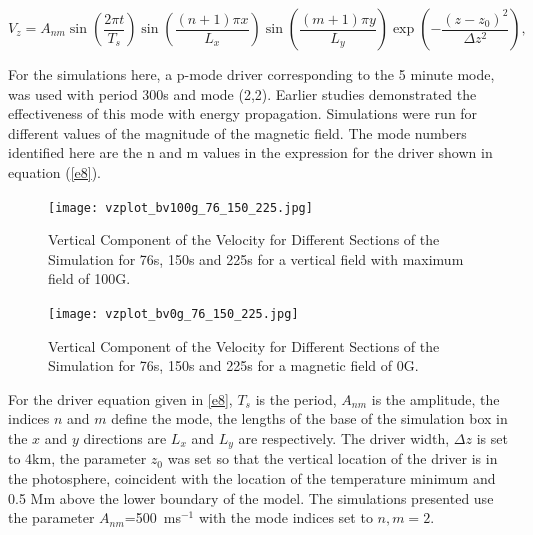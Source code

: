 \documentclass[linenumbers]{aastex63}
\begin{document}
\begin{equation}
 V_{z}  =  A_{nm} \sin\left(\frac{2\pi t}{T_s} \right)\sin\left(  \frac{(n+1)\pi x}{L_x} \right)  
 \sin\left(\frac{(m+1)\pi y}{L_y} \right) \exp\left( -\frac{(z-z_0)^2}{\Delta z^2} \right),
\label{e8}
\end{equation}

For the  simulations here, a p-mode driver corresponding to the 5 minute mode, was used with period 300s and mode (2,2). Earlier studies demonstrated the effectiveness of this mode with energy propagation. Simulations were run for different values of the magnitude of the magnetic field. The mode numbers identified here are the n and m values in the expression for the driver shown in equation (\ref{e8}).


\begin{figure}\label{vzplot_bv100g_76_150_225}
\texttt{[image: vzplot\_bv100g\_76\_150\_225.jpg]}
\caption{Vertical Component of the Velocity for Different Sections of the Simulation for 76s, 150s and 225s for a vertical field with maximum field of 100G.}
\end{figure}



\begin{figure}\label{vzplot_bv0g_76_150_225}
\texttt{[image: vzplot\_bv0g\_76\_150\_225.jpg]}
\caption{Vertical Component of the Velocity for Different Sections of the Simulation for 76s, 150s and 225s for a magnetic field of 0G.}
\end{figure}





For the driver equation given in \ref{e8}, $T_{s}$ is the period, $A_{nm}$ is the amplitude, the indices $n$ and $m$ define the mode, the lengths of the base of the simulation box in the $x$ and $y$ directions are $L_{x}$ and $L_{y}$ are  respectively. The driver width, $\Delta z$ is set to $4$km, the parameter $z_{0}$ was set so that the vertical location of the driver is in the photosphere, coincident with the location of the temperature minimum and 0.5 Mm above the lower boundary of the model. The simulations presented use the parameter $A_{nm}$=500\, ms$^{-1}$ with the mode indices set to $n,m=2$. 
\end{document}
